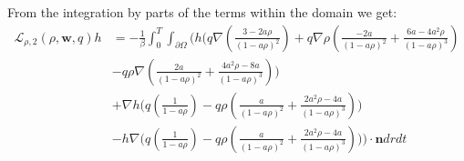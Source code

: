 \documentclass[11pt, a4paper]{article}
\theoremstyle{definition}
\newcommand{\w}{\mathbf{w}}
\newcommand{\n}{\mathbf{n}}
\begin{document}
From the integration by parts of the terms within the domain we get:
\begin{align*}
	\mathcal{L}_{\rho,2}(\rho, \w,q)h &= - \frac{1}{\beta}\int_0^T \int_{\partial \Omega} \bigg(h \bigg( q  \nabla \left( \frac{3-2a\rho}{(1-a\rho)^2} \right) + q \nabla \rho  \left( \frac{-2a }{(1-a\rho)^2} + \frac{6a-4a^2  \rho}{(1-a\rho)^3}  \right)\\
	&- q\rho \nabla \left(\frac{2a }{(1-a\rho)^2} + \frac{4a^2\rho -8a}{(1-a\rho)^3} \right) \bigg)\\
	& + \nabla h \bigg(q \left(\frac{1}{1- a\rho} \right)  - q\rho  \left(\frac{a }{(1-a\rho)^2} + \frac{2a^2\rho -4a}{(1-a\rho)^3} \right)  \bigg) \\
	&- h \nabla \bigg(q \left(\frac{1}{1- a\rho} \right)  - q\rho  \left(\frac{a }{(1-a\rho)^2} + \frac{2a^2\rho -4a}{(1-a\rho)^3} \right)  \bigg) \bigg)\cdot \n dr dt
\end{align*}
\end{document}
